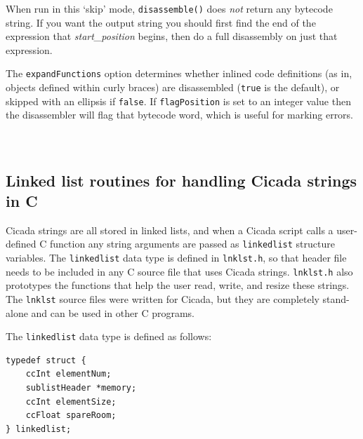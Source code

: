 \documentclass{article}
\newenvironment{code}{
       \begin{list}{}{
               \setlength{\leftmargin}{.4in}
               \setlength{\rightmargin}{0in}
               \setlength{\topsep}{.2in}
       }
       \small
       \item[] }
       { \end{list}   }
\begin{document}
\noindent When run in this `skip' mode, \verb#disassemble()# does \emph{not} return any bytecode string.  If you want the output string you should first find the end of the expression that \emph{start\_position} begins, then do a full disassembly on just that expression.

The \verb#expandFunctions# option determines whether inlined code definitions (as in, objects defined within curly braces) are disassembled (\verb#true# is the default), or skipped with an ellipsis if \verb#false#.  If \verb#flagPosition# is set to an integer value then the disassembler will flag that bytecode word, which is useful for marking errors.   \\\\\\









\subsection{Linked list routines for handling Cicada strings in C} 

Cicada strings are all stored in linked lists, and when a Cicada script calls a user-defined C function any string arguments are passed as \verb#linkedlist# structure variables.  The \verb#linkedlist# data type is defined in \verb#lnklst.h#, so that header file needs to be included in any C source file that uses Cicada strings.  \verb#lnklst.h# also prototypes the functions that help the user read, write, and resize these strings.  The \verb#lnklst# source files were written for Cicada, but they are completely stand-alone and can be used in other C programs.

The \verb#linkedlist# data type is defined as follows:

\begin{code} \begin{verbatim}
typedef struct {
    ccInt elementNum;
    sublistHeader *memory;
    ccInt elementSize;
    ccFloat spareRoom;
} linkedlist;
\end{verbatim} \end{code}
\end{document}
